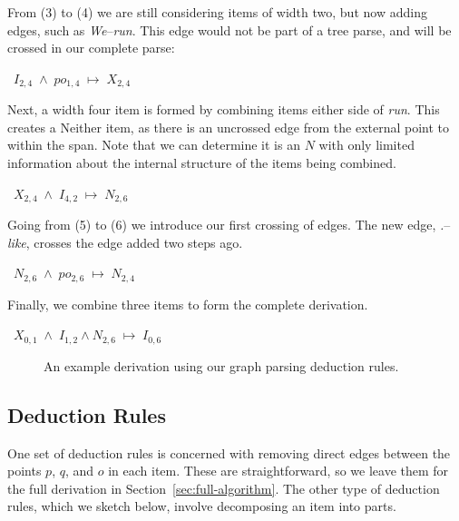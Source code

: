 \noindent
\parbox{4.5in}{
From (3) to (4) we are still considering items of width two, but now adding edges, such as \emph{We}--\emph{run}.
This edge would not be part of a tree parse, and will be crossed in our complete parse: \\
}\hfill\mbox{
  $I_{2,4} \; \land \; po_{1,4} \; \mapsto \; X_{2,4}$ 
}

\noindent
\parbox{4.5in}{
Next, a width four item is formed by combining items either side of \emph{run}.
This creates a Neither item, as there is an uncrossed edge from the external point to within the span.
Note that we can determine it is an $N$ with only limited information about the internal structure of the items being combined. \\
}\hfill\mbox{
  $X_{2,4} \; \land \; I_{4,2} \; \mapsto \; N_{2,6}$
}

\noindent
\parbox{4.5in}{
Going from (5) to (6) we introduce our first crossing of edges.
The new edge, \emph{.}--\emph{like}, crosses the edge added two steps ago. \\
}\hfill\mbox{
  $N_{2,6} \; \land \; po_{2,6} \; \mapsto \; N_{2,4}$ 
}

\noindent
\parbox{4in}{
Finally, we combine three items to form the complete derivation. \\
}\hfill\mbox{
  $X_{0,1} \; \land \; I_{1,2} \land N_{2,6} \; \mapsto \; I_{0,6}$
}

\begin{figure}
\centering
\vspace{-5mm}

\caption{\label{fig:alg-example}
An example derivation using our graph parsing deduction rules.
}
\end{figure}

\begin{landscape}

\end{landscape}

\subsection{Deduction Rules} \label{sec:deduction-rules-sketch}

\newlength{\deductionCaptionLength}
\newlength{\deductionRuleLength}
\setlength{\deductionCaptionLength}{0.35\textwidth}
\setlength{\deductionRuleLength}{0.95\textwidth}

One set of deduction rules is concerned with removing direct edges between the points $p$, $q$, and $o$ in each item.
These are straightforward, so we leave them for the full derivation in Section~\ref{sec:full-algorithm}.
The other type of deduction rules, which we sketch below, involve decomposing an item into parts.

